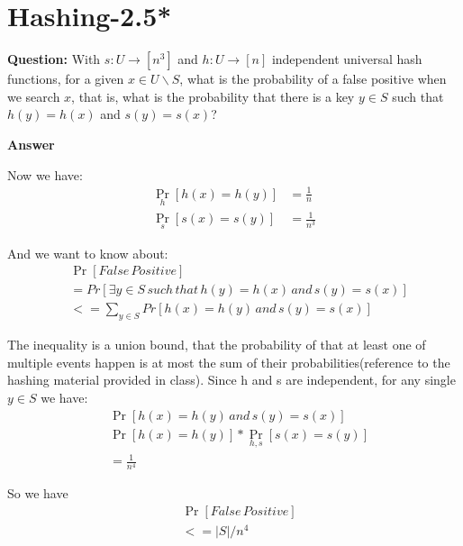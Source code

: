 \documentclass[12pt]{article}
\begin{document}
\section{Hashing-2.5*}
\textbf{Question: }
With $s: U \rightarrow [n^3]$ and $h : U \rightarrow [n]$ independent universal hash functions, for a given $x \in U \backslash S$, what is the probability of a false positive when we search $x$, that is, what is the probability that there is a key $y \in S$ such that $h(y) = h(x)$ and $s(y) = s(x)$?

\textbf{Answer}

Now we have:
\begin{equation}
\begin{aligned}
\mathop{Pr} \limits_{h} [h(x)=h(y)] &= \frac{1}{n}\\
\mathop{Pr} \limits_{s} [s(x)=s(y)] &= \frac{1}{n^3}
\end{aligned}
\end{equation}

And we want to know about:
\begin{equation}
\begin{aligned}
&\mathop{Pr}  [False \, Positive]\\
&= Pr[\exists y \in S \, such \, that \, h(y) = h(x) \, and \, s(y) = s(x)]\\
&<= \sum_{y \in S} Pr[h(x)=h(y) \, and \, s(y)=s(x)]
\end{aligned}
\end{equation}

The inequality is a union bound, that the probability of that at least one of multiple events happen is at most the sum of their probabilities(reference to the hashing material provided in class). Since h and s are independent, for any single $y \in S$ we have:
\begin{equation}
\begin{aligned}
&\mathop{Pr} [h(x)=h(y) \, and \, s(y)=s(x)] \\
&\mathop{Pr} [h(x)=h(y)] * \mathop{Pr} \limits_{h,s} [s(x)=s(y)] \\
&= \frac{1}{n^4}
\end{aligned}
\end{equation}

So we have
\begin{equation}
\begin{aligned}
&\mathop{Pr}  [False \, Positive]\\
&<= |S|/n^4
\end{aligned}
\end{equation}
\end{document}
